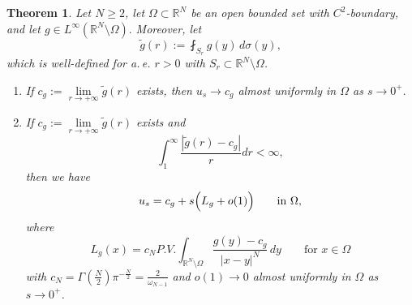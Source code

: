 \documentclass[notitlepage,11pt,reqno]{amsart}
\newtheorem{theorem}{Theorem}[section]
\theoremstyle{definition}
\numberwithin{equation}{section}
\newcommand{\RRN}{\mathds{R}^{N}}
\newcommand{\R}{\mathds{R}}
\newcommand{\RR}{\mathds{R}}
\begin{document}
\begin{theorem}\label{thm1.1}
  Let $N\geq 2$, let $\Omega \subset \RRN$ be an open bounded set with $C^2$-boundary, and let $g \in L^{\infty}(\RR^N\setminus \Omega).$
  Moreover, let
  \begin{equation}
    \label{eq:def-g-tilde}
    \tilde g(r):= \fint_{S_r}g(y)\,d\sigma(y),
  \end{equation}
  which is well-defined for a.\,e. $r>0$ with $S_r \subset \R^N \setminus \Omega$.
  \begin{enumerate}
  \item[(i)] If $c_g := \lim \limits_{r \to +\infty}\tilde g(r)$ exists, then $u_s \to c_g$ almost uniformly in $\Omega$ as $s \to 0^+.$
  \item[(ii)] If $c_g := \lim \limits_{r \to +\infty}\tilde g(r)$ exists and 
    \begin{equation}
      \label{eq:first-order-exp-assumption}
      \int_{1}^\infty \frac{|\tilde g(r)-c_g|}{r}dr < \infty,
    \end{equation}
    then we have
    \begin{equation}
      \label{eq:first-order-exp}
    u_s = c_g + s \Bigl(L_g+ o(1)\Bigr) \qquad \text{in $\Omega$,}
    \end{equation}
    where
    \begin{equation}
      \label{eq:def-L-g}
    L_g(x)= c_{N} P.V.\int_{\RR^N \setminus \Omega}\frac{g(y)-c_g}{|x-y|^N}\,dy \qquad \text{for $x \in \Omega$}
    \end{equation}
 with $c_N=\Gamma(\frac{N}{2})\pi^{-\frac{N}{2}}=\frac{2}{\omega_{N-1}}$ and $o(1) \to 0$ almost uniformly in $\Omega$ as $s \to 0^+$.     
  \end{enumerate} 
\end{theorem}
\end{document}
